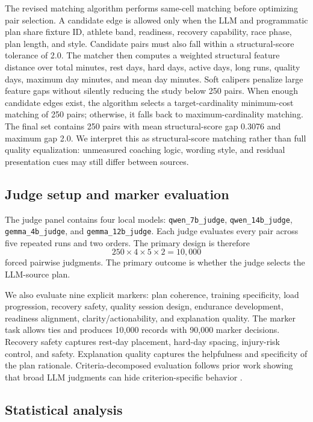 \documentclass[11pt]{article}
\begin{document}
The revised matching algorithm performs same-cell matching before optimizing pair selection. A candidate edge is allowed only when the LLM and programmatic plan share fixture ID, athlete band, readiness, recovery capability, race phase, plan length, and style. Candidate pairs must also fall within a structural-score tolerance of 2.0. The matcher then computes a weighted structural feature distance over total minutes, rest days, hard days, active days, long runs, quality days, maximum day minutes, and mean day minutes. Soft calipers penalize large feature gaps without silently reducing the study below 250 pairs. When enough candidate edges exist, the algorithm selects a target-cardinality minimum-cost matching of 250 pairs; otherwise, it falls back to maximum-cardinality matching. The final set contains 250 pairs with mean structural-score gap 0.3076 and maximum gap 2.0. We interpret this as structural-score matching rather than full quality equalization: unmeasured coaching logic, wording style, and residual presentation cues may still differ between sources.

\subsection{Judge setup and marker evaluation}

The judge panel contains four local models: \texttt{qwen\_7b\_judge}, \texttt{qwen\_14b\_judge}, \texttt{gemma\_4b\_judge}, and \texttt{gemma\_12b\_judge}. Each judge evaluates every pair across five repeated runs and two orders. The primary design is therefore
\[
250 \times 4 \times 5 \times 2 = 10{,}000
\]
forced pairwise judgments. The primary outcome is whether the judge selects the LLM-source plan.

We also evaluate nine explicit markers: plan coherence, training specificity, load progression, recovery safety, quality session design, endurance development, readiness alignment, clarity/actionability, and explanation quality. The marker task allows ties and produces 10,000 records with 90,000 marker decisions. Recovery safety captures rest-day placement, hard-day spacing, injury-risk control, and safety. Explanation quality captures the helpfulness and specificity of the plan rationale. Criteria-decomposed evaluation follows prior work showing that broad LLM judgments can hide criterion-specific behavior \citep{liu2024hdevalaligninglargelanguage}.

\subsection{Statistical analysis}
\end{document}
